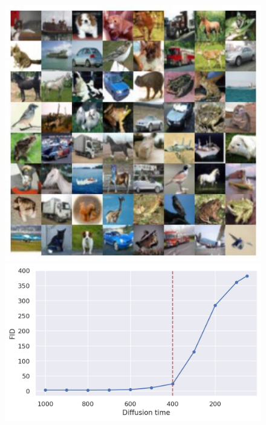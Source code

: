 \begin{figure}[ht!]
  \label{subfig:cifar10_900}
\endminipage\hfill
{}
  \includegraphics[width=\linewidth]{figs/imgs/ddpm_cifar10_data_samples_T_800.jpg}
  \label{subfig:cifar10_800}
\endminipage\hfill
{}
  \includegraphics[width=\linewidth]{figs/plots/cifar10_late_start_fids_vl.png}
\endminipage\hfill

\end{figure}
